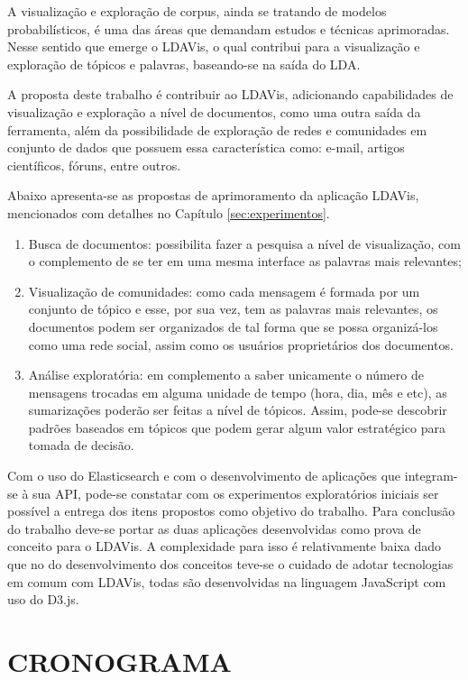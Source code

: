 \documentclass[12pt,a4paper]{article}
\begin{document}
A visualização e exploração de corpus, ainda se tratando de modelos probabilísticos, é uma das áreas que demandam estudos 
 e técnicas aprimoradas. Nesse sentido que emerge o LDAVis, o qual contribui para a visualização e exploração de tópicos e palavras,
 baseando-se na saída do LDA. 
 
 A proposta deste trabalho é contribuir ao LDAVis, adicionando capabilidades de visualização
 e exploração a nível de documentos, como uma outra saída da ferramenta, além da possibilidade de exploração de redes
 e comunidades em conjunto de dados que possuem essa característica como: e-mail, artigos científicos, fóruns, entre outros.

Abaixo apresenta-se as propostas de aprimoramento da aplicação LDAVis, mencionados com detalhes no Capítulo \ref{sec:experimentos}.

\begin{enumerate}
  \item Busca de documentos: possibilita fazer a pesquisa a nível de visualização, com o complemento de se ter em uma mesma interface as palavras mais relevantes;
  \item Visualização de comunidades: 
   como cada mensagem é formada por um conjunto de tópico e esse, por sua vez, tem as palavras mais relevantes, os documentos podem ser organizados de tal forma que se possa organizá-los como uma rede social, assim como os usuários proprietários dos documentos.
  \item Análise exploratória: em complemento a saber unicamente o número de mensagens trocadas em alguma unidade de tempo (hora, dia, mês e etc), as sumarizações poderão ser feitas a nível de tópicos. Assim, pode-se descobrir padrões baseados em tópicos que podem gerar algum valor estratégico para tomada de decisão. 
\end{enumerate}


Com o uso do Elasticsearch e com o desenvolvimento de aplicações que integram-se à sua API, pode-se constatar com os experimentos exploratórios iniciais ser possível 
 a entrega dos itens propostos como objetivo do trabalho. Para conclusão do trabalho deve-se portar as duas aplicações
 desenvolvidas como prova de conceito para o LDAVis. A complexidade para isso é relativamente baixa dado que  
 no do desenvolvimento dos conceitos teve-se o cuidado de adotar tecnologias em comum com LDAVis, todas são desenvolvidas
 na linguagem JavaScript com uso do D3.js.

\section{CRONOGRAMA} \label{sec:cronograma}
\end{document}
